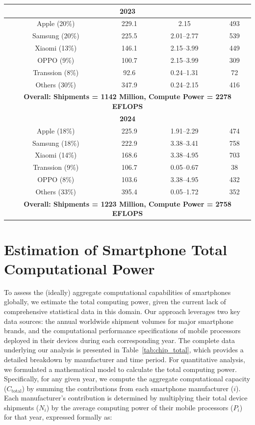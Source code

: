 \begin{table}[!ht]
{\begin{tabular}{cccc}
\multicolumn{4}{c}{\textbf{2023}} \\ \hline
Apple (20\%)   & 229.1 & 2.15 & 493 \\
Samsung (20\%) & 225.5 & 2.01--2.77 & 539 \\
Xiaomi (13\%)  & 146.1 & 2.15--3.99 & 449 \\
OPPO (9\%)     & 100.7 & 2.15--3.99 & 309 \\
Transsion (8\%)  & 92.6 & 0.24--1.31 & 72 \\
Others (30\%)  & 347.9 & 0.24--2.15 & 416 \\
\hline
\multicolumn{4}{c}{\textbf{Overall: Shipments = 1142 Million, Compute Power = 2278 EFLOPS}} \\ \hline \hline

\multicolumn{4}{c}{\textbf{2024}} \\ \hline
Apple (18\%)   & 225.9 & 1.91--2.29 & 474 \\
Samsung (18\%) & 222.9 & 3.38--3.41 & 758 \\
Xiaomi (14\%)  & 168.6 & 3.38--4.95 & 703 \\
Transsion (9\%)  & 106.7 & 0.05--0.67 & 38  \\
OPPO (8\%)   & 103.6 & 3.38--4.95 & 432 \\
Others (33\%)  & 395.4 & 0.05--1.72 & 352 \\
\hline
\multicolumn{4}{c}{\textbf{Overall: Shipments = 1223 Million, Compute Power = 2758 EFLOPS}} \\ \hline
\end{tabular}%
}
\end{table}

\section{Estimation of Smartphone Total Computational Power}  
\label{app:total_computation}

To assess the (ideally) aggregate computational capabilities of smartphones globally, we estimate the total computing power, given the current lack of comprehensive statistical data in this domain. Our approach leverages two key data sources: the annual worldwide shipment volumes for major smartphone brands, and the computational performance specifications of mobile processors deployed in their devices during each corresponding year. The complete data underlying our analysis is presented in Table~\ref{tab:chip_total}, which provides a detailed breakdown by manufacturer and time period.
For quantitative analysis, we formulated a mathematical model to calculate the total computing power. Specifically, for any given year, we compute the aggregate computational capacity ($C_{\text{total}}$) by summing the contributions from each smartphone manufacturer ($i$). Each manufacturer's contribution is determined by multiplying their total device shipments ($N_i$) by the average computing power of their mobile processors ($P_i$) for that year, expressed formally as:

